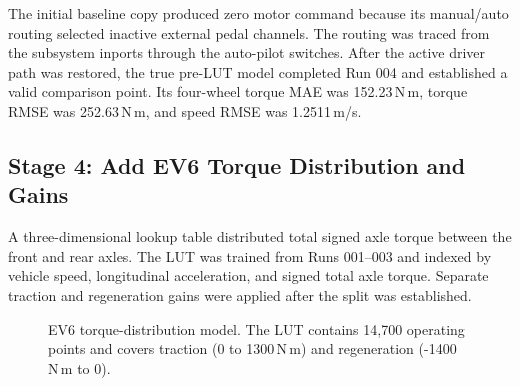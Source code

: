 \documentclass[11pt,letterpaper]{article}
\newcommand{\SI}[2]{#1\,#2}
\begin{document}
The initial baseline copy produced zero motor command because its manual/auto
routing selected inactive external pedal channels. The routing was traced from
the subsystem inports through the auto-pilot switches. After the active driver
path was restored, the true pre-LUT model completed Run 004 and established a
valid comparison point. Its four-wheel torque MAE was
\SI{152.23}{\ensuremath{\mathrm{N\,m}}}, torque RMSE was
\SI{252.63}{\ensuremath{\mathrm{N\,m}}}, and speed RMSE was \SI{1.2511}{m/s}.

\subsection{Stage 4: Add EV6 Torque Distribution and Gains}

A three-dimensional lookup table distributed total signed axle torque between
the front and rear axles. The LUT was trained from Runs 001--003 and indexed by
vehicle speed, longitudinal acceleration, and signed total axle torque. Separate
traction and regeneration gains were applied after the split was established.

\begin{figure}[!htbp]
\centering
{}
\caption{EV6 torque-distribution model. The LUT contains 14,700 operating
points and covers traction (0 to \SI{1300}{\ensuremath{\mathrm{N\,m}}}) and
regeneration (\SI{-1400}{\ensuremath{\mathrm{N\,m}}} to 0).}
\end{figure}
\end{document}
